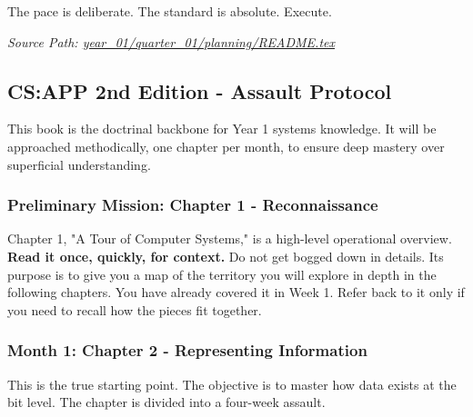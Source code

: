 \documentclass[11pt,a4paper]{report}
\begin{document}
The pace is deliberate. The standard is absolute. Execute.

\newpage

\noindent\textit{Source Path: \href{https://github.com/TEGDV/QuantitativeSystemsEngineering/blob/main/year_01/quarter_01/planning/README.tex}{year\_01/quarter\_01/planning/README.tex}}\\
\subsection{CS:APP 2nd Edition - Assault Protocol}

This book is the doctrinal backbone for Year 1 systems knowledge. It will be approached methodically, one chapter per month, to ensure deep mastery over superficial understanding.

\subsubsection{\textbf{Preliminary Mission: Chapter 1 - Reconnaissance}}

Chapter 1, "A Tour of Computer Systems," is a high-level operational overview. \textbf{Read it once, quickly, for context.} Do not get bogged down in details. Its purpose is to give you a map of the territory you will explore in depth in the following chapters. You have already covered it in Week 1. Refer back to it only if you need to recall how the pieces fit together.

\subsubsection{\textbf{Month 1: Chapter 2 - Representing Information}}

This is the true starting point. The objective is to master how data exists at the bit level. The chapter is divided into a four-week assault.
\end{document}
